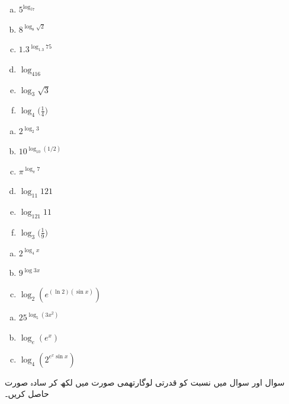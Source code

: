 \begin{multicols}{3}
\begin{enumerate}[a.]
\item
$5^{\log_57}$
\item
$8^{\log_8\sqrt{2}}$
\item
$1.3^{\log_{1.3}75}$
\item
$\log_416$
\item
$\log_3\sqrt{3}$
\item
$\log_4\big(\frac{1}{4}\big)$
\end{enumerate}
\end{multicols}
\begin{multicols}{3}
\begin{enumerate}[a.]
\item
$2^{\log_2 3}$
\item
$10^{\log_{10}(1/2)}$
\item
$\pi^{\log_{\pi}7}$
\item
$\log_{11}121$
\item
$\log_{121}11$
\item
$\log_3\big(\frac{1}{9}\big)$
\end{enumerate}
\end{multicols}
\begin{multicols}{3}
\begin{enumerate}[a.]
\item
$2^{\log_4 x}$
\item
$9^{\log 3 x}$
\item
$\log_2(e^{(\ln 2)(\sin x)})$
\end{enumerate}
\end{multicols}
\begin{multicols}{3}
\begin{enumerate}[a.]
\item
$25^{\log_5(3x^2)}$
\item
$\log_e(e^x)$
\item
$\log_4(2^{e^x\sin x})$
\end{enumerate}
\end{multicols}
سوال  اور سوال  میں نسبت کو قدرتی لوگارتھمی صورت میں لکھ کر سادہ صورت حاصل کریں۔

